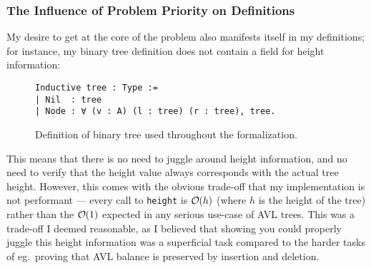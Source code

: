 \documentclass[acmsmall, authorversion, nonacm, overload]{acmart}
\DeclareRobustCommand{\bigO}{%
  \text{\usefont{OMS}{cmsy}{m}{n}O}%
}
\begin{document}
\subsubsection{The Influence of Problem Priority on Definitions}
My desire to get at the core of the problem also manifests itself in my definitions; for instance,
my binary tree definition does not contain a field for height information:
\begin{figure}[h!]
\begin{verbatim}
Inductive tree : Type :=
| Nil  : tree
| Node : ∀ (v : A) (l : tree) (r : tree), tree.
\end{verbatim}
  \caption{Definition of binary tree used throughout the formalization.}%
  \label{fig:tree_def}
\end{figure}

This means that there is no need to juggle around height information,
and no need to verify that the height value always corresponds with the actual tree height.
However, this comes with the obvious trade-off that my implementation is not performant --- every call to
\texttt{height} is $\bigO(h)$ (where $h$ is the height of the tree)
rather than the $\bigO(1)$ expected in any serious use-case of AVL trees.
This was a trade-off I deemed reasonable, as I believed that showing you could properly juggle this height information
was a superficial task compared to the harder tasks of eg.\ proving that AVL balance is preserved
by insertion and deletion.
\end{document}

